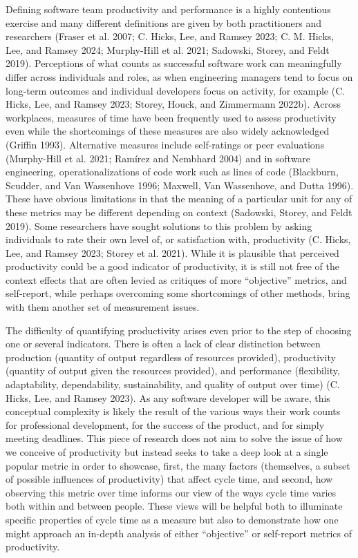 \documentclass[
]{article}
\begin{document}
Defining software team productivity and performance is a highly
contentious exercise and many different definitions are given by both
practitioners and researchers (Fraser et al. 2007; C. Hicks, Lee, and
Ramsey 2023; C. M. Hicks, Lee, and Ramsey 2024; Murphy-Hill et al. 2021;
Sadowski, Storey, and Feldt 2019). Perceptions of what counts as
successful software work can meaningfully differ across individuals and
roles, as when engineering managers tend to focus on long-term outcomes
and individual developers focus on activity, for example (C. Hicks, Lee,
and Ramsey 2023; Storey, Houck, and Zimmermann 2022b). Across
workplaces, measures of time have been frequently used to assess
productivity even while the shortcomings of these measures are also
widely acknowledged (Griffin 1993). Alternative measures include
self-ratings or peer evaluations (Murphy-Hill et al. 2021; Ramírez and
Nembhard 2004) and in software engineering, operationalizations of code
work such as lines of code (Blackburn, Scudder, and Van Wassenhove 1996;
Maxwell, Van Wassenhove, and Dutta 1996). These have obvious limitations
in that the meaning of a particular unit for any of these metrics may be
different depending on context (Sadowski, Storey, and Feldt 2019). Some
researchers have sought solutions to this problem by asking individuals
to rate their own level of, or satisfaction with, productivity (C.
Hicks, Lee, and Ramsey 2023; Storey et al. 2021). While it is plausible
that perceived productivity could be a good indicator of productivity,
it is still not free of the context effects that are often levied as
critiques of more ``objective'' metrics, and self-report, while perhaps
overcoming some shortcomings of other methods, bring with them another
set of measurement issues.

The difficulty of quantifying productivity arises even prior to the step
of choosing one or several indicators. There is often a lack of clear
distinction between production (quantity of output regardless of
resources provided), productivity (quantity of output given the
resources provided), and performance (flexibility, adaptability,
dependability, sustainability, and quality of output over time) (C.
Hicks, Lee, and Ramsey 2023). As any software developer will be aware,
this conceptual complexity is likely the result of the various ways
their work counts for professional development, for the success of the
product, and for simply meeting deadlines. This piece of research does
not aim to solve the issue of how we conceive of productivity but
instead seeks to take a deep look at a single popular metric in order to
showcase, first, the many factors (themselves, a subset of possible
influences of productivity) that affect cycle time, and second, how
observing this metric over time informs our view of the ways cycle time
varies both within and between people. These views will be helpful both
to illuminate specific properties of cycle time as a measure but also to
demonstrate how one might approach an in-depth analysis of either
``objective'' or self-report metrics of productivity.
\end{document}
